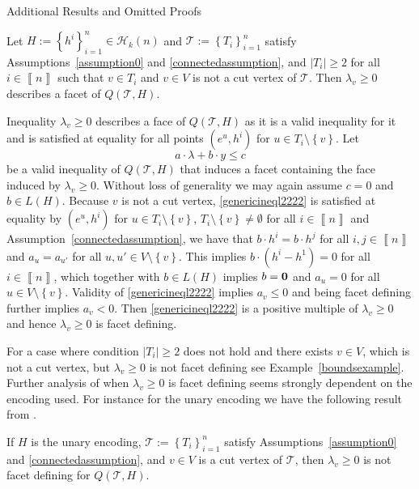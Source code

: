 \documentclass[mnsc]{informs3}
\newcommand{\set}[1]{\left\{#1\right\}}                     %
\newcommand{\abs}[1]{\left|#1\right|}                       %
\newcommand{\bra}[1]{\left(#1\right)}
\newcommand{\sidx}[1]{\left\llbracket     #1 \right\rrbracket}
\begin{document}
\begin{APPENDIX}{Additional Results and Omitted Proofs}
\begin{lemma}\label{cutvertexlemma}Let $H:=\set{h^i}_{i=1}^n\in \mathcal{H}_k(n)$ and $\mathcal{T}:=\set{T_i}_{i=1}^n$ satisfy Assumptions~\ref{assumption0} and \ref{connectedassumption}, and  $\abs{T_i}\geq 2$ for all $i\in \sidx{n}$ such that $v\in T_i$ and $v\in V$ is not a cut vertex of $\mathcal{T}$.  Then $\lambda_v\geq 0$ describes a facet of $Q\bra{\mathcal{T},H}$.
\end{lemma}
 Inequality $\lambda_v\geq 0$ describes a face of $Q\bra{\mathcal{T},H}$ as it is a valid inequality for it and is satisfied at equality for all points $\bra{e^u,h^i}$
for $u\in T_i\setminus \set{v}$. Let 
\begin{equation}\label{genericineql2222}
 a\cdot\lambda + b\cdot y\leq c 
\end{equation}
be a valid inequality of $Q\bra{\mathcal{T},H}$ that induces a facet containing the face induced by $\lambda_v\geq 0$. Without loss of generality we may again assume $c=0$ and $b\in L\bra{H}$. Because $v$ is not a cut vertex, \eqref{genericineql2222} is satisfied at equality by $\bra{e^u,h^i}$
for $u\in T_i\setminus \set{v}$, $T_i\setminus \set{v}\neq \emptyset $ for all $i\in \sidx{n}$ and Assumption~\ref{connectedassumption}, we have that $b\cdot h^i=b\cdot h^j$ for all $i,j\in \sidx{n}$ and $a_u=a_{u'}$ for all $u,u'\in V\setminus \set{v}$. This implies $b\cdot\bra{h^i-h^1}=0$ for all $i\in\sidx{n}$, which together with $b\in L\bra{H}$ implies $b=\bf 0$ and $a_u=0$ for all $u\in V\setminus\set{v}$. Validity of \eqref{genericineql2222} implies $a_v\leq 0$ and being facet defining further implies $a_v<0$. Then \eqref{genericineql2222} is a positive multiple of $\lambda_v\geq 0$  and hence $\lambda_v\geq 0$ is facet defining.   
\Halmos\endproof


For a case where condition $\abs{T_i}\geq 2$ does not hold and there exists $v\in V$, which is not a cut vertex, but $\lambda_v\geq 0$ is not facet defining see Example~\ref{boundsexample}. Further analysis of when $\lambda_v\geq 0$ is facet defining seems strongly dependent on the encoding used. For instance for the unary encoding we have the following result from \cite{lee01}.

\begin{lemma} If $H$ is the unary encoding, $\mathcal{T}:=\set{T_i}_{i=1}^n$ satisfy Assumptions~\ref{assumption0} and \ref{connectedassumption}, and $v\in V$ is  a cut vertex of $\mathcal{T}$, then $\lambda_v\geq 0$ is not facet defining for $Q\bra{\mathcal{T},H}$.
\end{lemma}


\end{APPENDIX}
\end{document}
